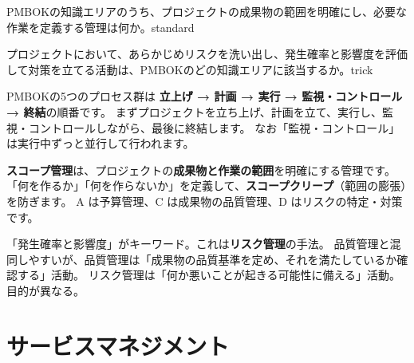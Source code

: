 \begin{mondai}{PMBOKの知識エリアのうち、プロジェクトの成果物の範囲を明確にし、必要な作業を定義する管理は何か。}{standard}
\end{mondai}

\begin{mondai}{プロジェクトにおいて、あらかじめリスクを洗い出し、発生確率と影響度を評価して対策を立てる活動は、PMBOKのどの知識エリアに該当するか。}{trick}
\end{mondai}

\kaitoupage

\begin{kaisetsu}
PMBOKの5つのプロセス群は
\textbf{立上げ → 計画 → 実行 → 監視・コントロール → 終結}の順番です。
まずプロジェクトを立ち上げ、計画を立て、実行し、監視・コントロールしながら、最後に終結します。
なお「監視・コントロール」は実行中ずっと並行して行われます。
\end{kaisetsu}

\begin{kaisetsu}
\textbf{スコープ管理}は、プロジェクトの\textbf{成果物と作業の範囲}を明確にする管理です。
「何を作るか」「何を作らないか」を定義して、\textbf{スコープクリープ}（範囲の膨張）を防ぎます。
A は予算管理、C は成果物の品質管理、D はリスクの特定・対策です。
\end{kaisetsu}

\begin{trickwarn}
「発生確率と影響度」がキーワード。これは\textbf{リスク管理}の手法。
品質管理と混同しやすいが、品質管理は「成果物の品質基準を定め、それを満たしているか確認する」活動。
リスク管理は「何か悪いことが起きる可能性に備える」活動。目的が異なる。
\end{trickwarn}




\section{サービスマネジメント}


